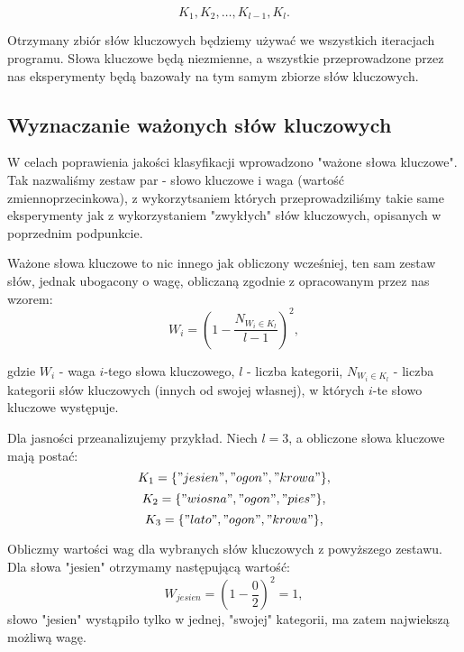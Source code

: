 \documentclass{classrep}
\begin{document}
\begin{equation}
            K_{1}, K_{2}, \ldots , K_{l-1}, K_{l}.
 \end{equation}	

Otrzymany zbiór słów kluczowych będziemy używać we wszystkich iteracjach programu. Słowa kluczowe będą niezmienne, a wszystkie przeprowadzone przez nas eksperymenty będą bazowały na tym samym zbiorze słów kluczowych.

\subsection{Wyznaczanie ważonych słów kluczowych}

W celach poprawienia jakości klasyfikacji wprowadzono "ważone słowa kluczowe". Tak nazwaliśmy zestaw par - słowo kluczowe i waga (wartość zmiennoprzecinkowa), z wykorzytsaniem których przeprowadziliśmy takie same eksperymenty jak z wykorzystaniem "zwykłych" słów kluczowych, opisanych w poprzednim podpunkcie. \newline

Ważone słowa kluczowe to nic innego jak obliczony wcześniej, ten sam zestaw słów, jednak ubogacony o wagę, obliczaną zgodnie z opracowanym przez nas wzorem:
\begin{equation}
            W_{i} = \left({1 - \frac{N_{W_{i} \in K_{l}}}{l - 1}}\right)^2,
 \end{equation}	

gdzie $W_{i}$ - waga $i$-tego słowa kluczowego, $l$ - liczba kategorii, $N_{W_{i} \in K_{l}}$ - liczba kategorii słów kluczowych (innych od swojej własnej), w których $i$-te słowo kluczowe występuje. \newline

Dla jasności przeanalizujemy przykład. Niech $l = 3$, a obliczone słowa kluczowe mają postać:\newline
\begin{equation}
            K_{1} = \{{"jesien", "ogon", "krowa"}\},
\end{equation}
\begin{equation}
            K_{2} =\{{"wiosna", "ogon", "pies"}\},
\end{equation}	
\begin{equation}
            K_{3} = \{{"lato", "ogon", "krowa"}\},
\end{equation}	

Obliczmy wartości wag dla wybranych słów kluczowych z powyższego zestawu. Dla słowa "jesien" otrzymamy następującą wartość:
\begin{equation}
            W_{jesien} = \left({1 - \frac{0}{2}}\right)^2 = 1,
\end{equation}
słowo "jesien" wystąpiło tylko w jednej, "swojej" kategorii, ma zatem najwiekszą możliwą wagę.
\end{document}
